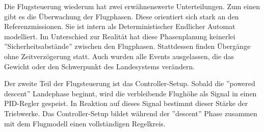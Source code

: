 Die Flugsteuerung wiederum hat zwei erwähnenswerte Unterteilungen. Zum einen gibt es die Überwachung der Flugphasen. Diese orientiert sich stark an den Referenzmissionen. Sie ist intern als Deterministischer Endlicher Automat  modelliert. Im Unterschied zur Realität hat diese Phasenplanung keinerlei ''Sicherheitsabstände'' zwischen den Flugphasen. Stattdessen finden Übergänge ohne Zeitverzögerung statt. Auch wurden alle Events ausgelassen, die das Gewicht oder den Schwerpunkt des Landesystems verändern.

Der zweite Teil der Flugsteuerung ist das Controller-Setup. Sobald die ''powered descent'' Landephase beginnt, wird die verbleibende Flughöhe als Signal in einen PID-Regler gespeist. In Reaktion auf dieses Signal bestimmt dieser Stärke der Triebwerke. Das Controller-Setup bildet während der ''descent'' Phase zusammen mit dem Flugmodell einen voll\-stän\-di\-gen Regelkreis.
